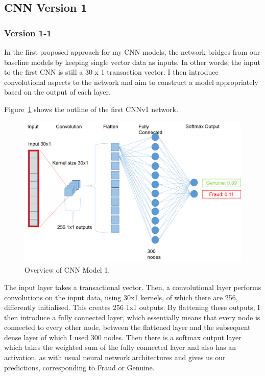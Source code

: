 \documentclass[12pt,a4paper,twoside]{report}
\begin{document}
\subsection{CNN Version 1}

\subsubsection{Version 1-1}
In the first proposed approach for my CNN models, the network bridges from our baseline models by keeping single vector data as inputs. In other words, the input to the first CNN is still a 30 x 1 transaction vector. I then introduce convolutional aspects to the network and aim to construct a model appropriately based on the output of each layer. 

Figure~\ref{fig:cnnv1} shows the outline of the first CNNv1 network.

\begin{figure}[!htbp]
\centering
\includegraphics[scale=0.6]{cnnv1}
\caption{Overview of CNN Model 1.}
\label{fig:cnnv1}
\end{figure}

The input layer takes a transactional vector. Then, a convolutional layer performs convolutions on the input data, using 30x1 kernels, of which there are 256, differently initialised. This creates 256 1x1 outputs. By flattening these outputs, I then introduce a fully connected layer, which essentially means that every node is connected to every other node, between the flattened layer and the subsequent dense layer of which I used 300 nodes. Then there is a softmax output layer which takes the weighted sum of the fully connected layer and also has an activation, as with usual neural network architectures and gives us our predictions, corresponding to Fraud or Genuine.
\end{document}
